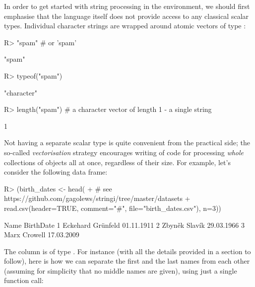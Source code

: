 \documentclass[nojss]{jss}
\begin{document}
In order to get started with string processing in the 
environment, we should first emphasise that the language itself
does not provide access to any classical scalar types.
Individual character strings are  wrapped around atomic vectors
of type :

\begin{Schunk}
\begin{Sinput}
R> "spam"          # or 'spam'
\end{Sinput}
\begin{Soutput}
[1] "spam"
\end{Soutput}
\begin{Sinput}
R> typeof("spam")
\end{Sinput}
\begin{Soutput}
[1] "character"
\end{Soutput}
\begin{Sinput}
R> length("spam")  # a character vector of length 1 - a single string
\end{Sinput}
\begin{Soutput}
[1] 1
\end{Soutput}
\end{Schunk}

\noindent
Not having a separate scalar type is quite convenient
from the practical side; the so-called
\emph{vectorisation} strategy encourages writing of code for processing
\textit{whole} collections of objects all at once, regardless of their size.
For example, let's consider the following data frame:


\begin{Schunk}
\begin{Sinput}
R> (birth_dates <- head(
+      # see https://github.com/gagolews/stringi/tree/master/datasets
+      read.csv(header=TRUE, comment="#", file="birth_dates.csv"), n=3))
\end{Sinput}
\begin{Soutput}
               Name  BirthDate
1 Eckehard Grünfeld 01.11.1911
2     Zbyněk Slavík 29.03.1966
3      Marx Crowell 17.03.2009
\end{Soutput}
\end{Schunk}

\noindent
The  column is of type .
For instance (with all the details provided in a section to follow),
here is how we can separate the first and the last names from
each other (assuming for simplicity that no middle names are given),
using just a single function call:
\end{document}
